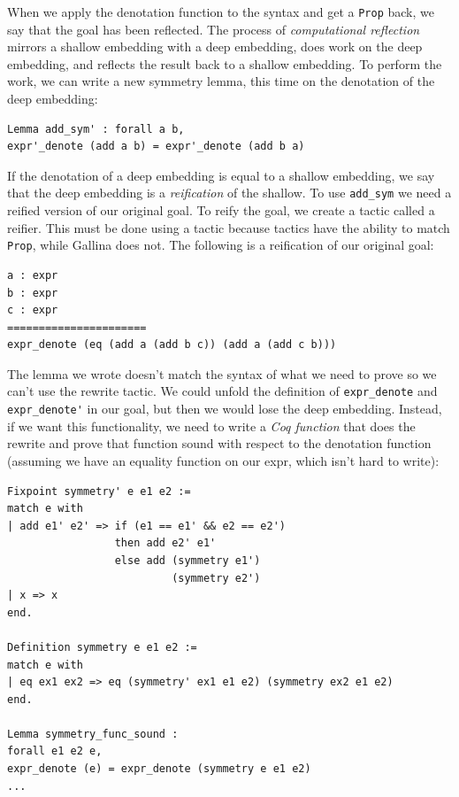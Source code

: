 \documentclass{puthesis}
\begin{document}
When we apply
the denotation function to the syntax and get a \lstinline|Prop| back,
we say that the goal has been reflected. The process of
\emph{computational reflection} mirrors a shallow embedding with a
deep embedding, does work on the deep embedding, and reflects the
result back to a shallow embedding. To perform the work, we can write a
new symmetry lemma, this time on the denotation of the deep embedding:

\begin{lstlisting}
Lemma add_sym' : forall a b, 
expr'_denote (add a b) = expr'_denote (add b a)
\end{lstlisting}

If the denotation of a deep embedding is equal to a shallow embedding,
we say that the deep embedding is a \emph{reification} of the shallow.
To use \lstinline|add_sym| we need a reified version of our original
goal.  To reify the goal, we create a tactic called a reifier. This
must be done using a tactic because tactics have the ability to match
\lstinline|Prop|, while Gallina does not. The following is a
reification of our original goal:

\pagebreak
\begin{lstlisting}
a : expr
b : expr
c : expr
======================
expr_denote (eq (add a (add b c)) (add a (add c b)))  
\end{lstlisting}

The lemma we wrote doesn't match the syntax of what we need to prove
so we can't use the rewrite tactic. We could unfold the definition of
\lstinline|expr_denote| and \lstinline|expr_denote'| in our goal, but
then we would lose the deep embedding. Instead, if we want this
functionality, we need to write a \emph{Coq function} that does the
rewrite and prove that function sound with respect to the denotation
function (assuming we have an equality function on our expr, which
isn't hard to write):

\begin{lstlisting}
Fixpoint symmetry' e e1 e2 := 
match e with
| add e1' e2' => if (e1 == e1' && e2 == e2') 
                 then add e2' e1' 
                 else add (symmetry e1') 
                          (symmetry e2')
| x => x
end.

Definition symmetry e e1 e2 :=
match e with
| eq ex1 ex2 => eq (symmetry' ex1 e1 e2) (symmetry ex2 e1 e2)
end.

Lemma symmetry_func_sound : 
forall e1 e2 e,
expr_denote (e) = expr_denote (symmetry e e1 e2)
...
\end{lstlisting}
\end{document}
